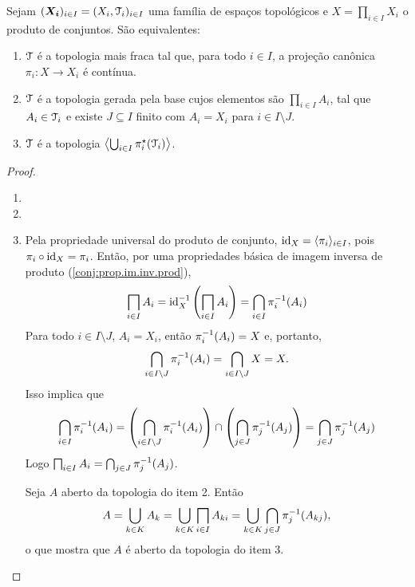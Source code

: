 \begin{prop}
Sejam $(\bm{X_i})_{i \in I} = (X_i,\mathcal{T}_i)_{i \in I}$ uma família de espaços topológicos e $X = \prod_{i \in I} X_i$ o produto de conjuntos. São equivalentes:
	\begin{enumerate}
	\item $\mathcal{T}$ é a topologia mais fraca tal que, para todo $i \in I$, a projeção canônica $\pi_i: X \to X_i$ é contínua.
	\item $\mathcal{T}$ é a topologia gerada pela base cujos elementos são $\prod_{i \in I} A_i$, tal que $A_i \in \mathcal{T}_i$ e existe $J \subseteq I$ finito com $A_i = X_i$ para $i \in I \setminus J$.
	\item $\mathcal{T}$ é a topologia $\left\langle \bigcup_{i \in I}\pi_i^\star(\mathcal{T}_i) \right\rangle$.
	\end{enumerate}
\end{prop}
\begin{proof}
	\begin{enumerate}
	\item
	
	\item
	
	\item Pela propriedade universal do produto de conjunto, $\mathrm{id}_X = \langle \pi_i \rangle_{i \in I}$, pois $\pi_i \circ \mathrm{id}_X = \pi_i$. Então, por uma propriedades básica de imagem inversa de produto (\ref{conj:prop.im.inv.prod}),
	\begin{equation*}
	\prod_{i \in I} A_i = \id_X\inv \left(\prod_{i \in I} A_i\right) = \bigcap_{i \in I} \pi_i\inv(A_i)
	\end{equation*}
Para todo $i \in I \setminus J$, $A_i=X_i$, então $\pi_i^{-1}(A_i)=X$ e, portanto,
	\begin{equation*}
	\bigcap_{i \in I\setminus J} \pi_i^{-1}(A_i) = \bigcap_{i \in I\setminus J} X = X.
	\end{equation*}
Isso implica que
	\begin{equation*}
	\bigcap_{i \in I} \pi_i^{-1}(A_i) = \left(\bigcap_{i \in I\setminus J} \pi_i^{-1}(A_i)\right) \cap \left(\bigcap_{j \in J} \pi_j^{-1}(A_j)\right) =  \bigcap_{j \in J} \pi_j^{-1}(A_j)
	\end{equation*}
Logo $\prod_{i \in I} A_i = \bigcap_{j \in J} \pi_j\inv(A_j)$.

Seja $A$ aberto da topologia do item 2.	Então
	\begin{equation*}
	A = \bigcup_{k \in K} A_k = \bigcup_{k \in K}\prod_{i \in I} A_{ki} = \bigcup_{k \in K}\bigcap_{j \in J} \pi_j\inv (A_{kj}),
	\end{equation*}
o que mostra que $A$ é aberto da topologia do item 3.
	\end{enumerate}
\end{proof}

